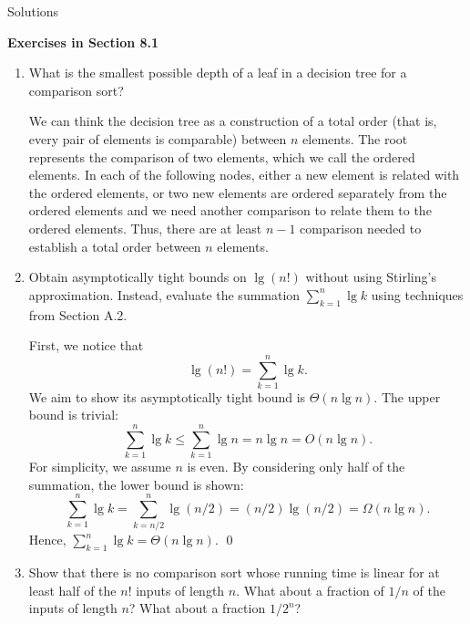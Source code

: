 \documentclass[12pt,reqno]{amsart}
\newif\ifanswer
\begin{document}
\hspace{10.5cm} {\footnotesize Solutions}

\vspace{0.5cm}
\hspace{5.5cm}\textbf{\large Exercises in Section 8.1}
\vspace{0.5cm}

\begin{enumerate}[1.]

\item What is the smallest possible depth of a leaf in a decision tree for a comparison sort?

\ifanswer
{}
We can think the decision tree as a construction of a total order (that is, every pair of elements is comparable) between $n$ elements. The root represents the comparison of two elements, which we call the ordered elements. In each of the following nodes, either a new element is related with the ordered elements, or two new elements are ordered separately from the ordered elements and we need another comparison to relate them to the ordered elements. Thus, there are at least $n - 1$ comparison needed to establish a total order between $n$ elements.
\vspace{1cm}



\item Obtain asymptotically tight bounds on $\lg{(n!)}$ without using Stirling's approximation. Instead, evaluate the summation $\sum_{k = 1}^n{\lg{k}}$ using techniques from Section A.2.

\ifanswer
{}
First, we notice that
$$
\lg{(n!)} = \sum_{k = 1}^n{\lg{k}}.
$$
We aim to show its asymptotically tight bound is $\Theta(n\lg{n})$. The upper bound is trivial:
$$
\sum_{k = 1}^n{\lg{k}} \leq \sum_{k = 1}^n{\lg{n}} = n\lg{n} = O(n\lg{n}).
$$
For simplicity, we assume $n$ is even. By considering only half of the summation, the lower bound is shown:
$$
\sum_{k = 1}^n{\lg{k}} = \sum_{k = n/2}^n{\lg{(n/2)}} = (n/2)\lg{(n/2)} = \Omega(n\lg{n}).
$$
Hence, $\sum_{k = 1}^n{\lg{k}} = \Theta(n\lg{n})$. \qed
\vspace{1cm}



\item Show that there is no comparison sort whose running time is linear for at least half of the $n!$ inputs of length $n$. What about a fraction of $1/n$ of the inputs of length $n$? What about a fraction $1/2^n$?


\end{enumerate}
\end{document}
